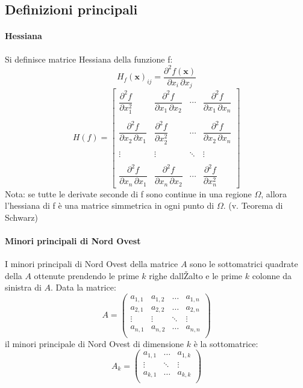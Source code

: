 \documentclass[a4paper,12pt]{book}
\begin{document}
\subsection{Definizioni principali}

\paragraph{Hessiana}
Si definisce matrice Hessiana della funzione f:
$$  H_{f}(\mathbf{x})_{ij} = \frac{\partial^2 f(\mathbf{x})}{\partial x_i\, \partial x_j} $$
$$ H(f) = \begin{bmatrix} \dfrac{\partial^2 f}{\partial x_1^2} & \dfrac{\partial^2 f}{\partial x_1\,\partial x_2} & \cdots & \dfrac{\partial^2 f}{\partial x_1\,\partial x_n} \\ \\ \dfrac{\partial^2 f}{\partial x_2\,\partial x_1} & \dfrac{\partial^2 f}{\partial x_2^2} & \cdots & \dfrac{\partial^2 f}{\partial x_2\,\partial x_n} \\ \\ \vdots & \vdots & \ddots & \vdots \\ \\ \dfrac{\partial^2 f}{\partial x_n\,\partial x_1} & \dfrac{\partial^2 f}{\partial x_n\,\partial x_2} & \cdots & \dfrac{\partial^2 f}{\partial x_n^2} \end{bmatrix}$$
Nota: se tutte le derivate seconde di f sono continue in una regione $\Omega$, allora l'hessiana di f è una matrice simmetrica in ogni punto di $\Omega$. (v. Teorema di Schwarz)

\paragraph{Minori principali di Nord Ovest}
I minori principali di Nord Ovest della matrice $A$ sono le sottomatrici quadrate della $A$ ottenute prendendo le prime $k$ righe dallŽalto e le prime $k$ colonne da sinistra di $A$.
Data la matrice:
\begin{displaymath}
A=\left(\begin{array}{cccc}
a_{1,1} & a_{1,2} & \dots &a_{1,n} \\

a_{2,1} & a_{2,2} & \dots &a_{2,n} \\

\vdots & \vdots & \ddots & \vdots \\

a_{n,1} & a_{n,2} & \dots &a_{n,n} \\
\end{array}\right)
\end{displaymath}
il minori principale di Nord Ovest di dimensione $k$ è la sottomatrice:
\begin{displaymath}
A_k=\left(\begin{array}{ccc}
a_{1,1} &  \dots &a_{1,k} \\


\vdots & \ddots & \vdots \\

a_{k,1} & \dots &a_{k,k} \\
\end{array}\right)
\end{displaymath}
\end{document}
